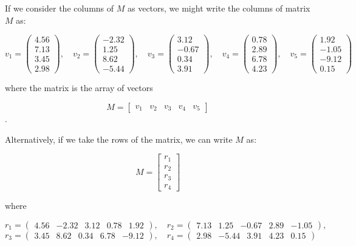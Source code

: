 \documentclass{ximera}
\begin{document}
\begin{remark}
\begin{example}

    If we consider the columns of $M$ as vectors, we might write the columns of matrix $M$ as: 

    \[
v_1 = \begin{pmatrix} 4.56 \\ 7.13 \\ 3.45 \\ 2.98 \end{pmatrix}, \quad
v_2 = \begin{pmatrix} -2.32 \\ 1.25 \\ 8.62 \\ -5.44 \end{pmatrix}, \quad
v_3 = \begin{pmatrix} 3.12 \\ -0.67 \\ 0.34 \\ 3.91 \end{pmatrix}, \quad
v_4 = \begin{pmatrix} 0.78 \\ 2.89 \\ 6.78 \\ 4.23 \end{pmatrix}, \quad
v_5 = \begin{pmatrix} 1.92 \\ -1.05 \\ -9.12 \\ 0.15 \end{pmatrix}
\]

where the matrix is the array of vectors

    \[
M =
\left[\begin{array}{ccccc}
  v_1 & v_2 & v_3 & v_4 & v_5
\end{array}
\right]
\].

Alternatively, if we take the rows of the matrix, we can write $M$ as:

\[
M =
\left[\begin{array}{c}
  r_1 \\
  r_2 \\
  r_3 \\
  r_4
\end{array}
\right]
\]

where

\[
r_1 = \begin{pmatrix} 4.56 & -2.32 & 3.12 & 0.78 & 1.92 \end{pmatrix}, \quad
r_2 = \begin{pmatrix} 7.13 & 1.25 & -0.67 & 2.89 & -1.05 \end{pmatrix}, \quad \]
\[
r_3 = \begin{pmatrix} 3.45 & 8.62 & 0.34 & 6.78 & -9.12 \end{pmatrix}, \quad
r_4 = \begin{pmatrix} 2.98 & -5.44 & 3.91 & 4.23 & 0.15 \end{pmatrix}
\]\



\end{example}
\end{remark}
\end{document}
